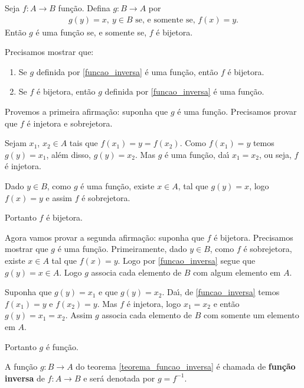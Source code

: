 \begin{teorema}\label{teorema_funcao_inversa}
	Seja $f: A \to B$ fun{\c c}{\~a}o. Defina $g : B \to A$ por
	\begin{align}\label{funcao_inversa}
		g(y) = x,\ y \in B \mbox{ se, e somente se, } f(x) = y.
	\end{align}
	Ent{\~a}o $g$ {\'e} uma fun{\c c}{\~a}o se, e somente se, $f$ {\'e} bijetora.
\end{teorema}
\begin{prova}
	Precisamos mostrar que:
	\begin{enumerate}[label={\roman*})]
		\item Se $g$ definida por \eqref{funcao_inversa} \'e uma fun\c{c}\~ao, ent\~ao $f$ \'e bijetora.
		\item Se $f$ \'e bijetora, ent\~ao $g$ definida por \eqref{funcao_inversa} \'e uma fun\c{c}\~ao.
	\end{enumerate}

	Provemos a primeira afirma\c{c}\~ao: suponha que $g$ \'e uma fun\c{c}\~ao. Precisamos provar que $f$ {\'e} injetora e sobrejetora.

	Sejam $x_1$, $x_2 \in A$ tais que $f(x_1) = y = f(x_2)$. Como $f(x_1) = y$ temos $g(y) = x_1$, al{\'e}m disso, $g(y) = x_2$. Mas $g$ {\'e} uma fun{\c c}{\~a}o, da{\'\i} $x_1 = x_2$, ou seja, $f$ {\'e} injetora.

	Dado $y \in B$, como $g$ {\'e} uma fun{\c c}{\~a}o, existe $x \in A$, tal que $g(y) = x$, logo $f(x) = y$ e assim $f$ {\'e} sobrejetora.

	Portanto $f$ {\'e} bijetora.

	Agora vamos provar a segunda afirma\c{c}\~ao: suponha que $f$ \'e bijetora. Precisamos mostrar que $g$ \'e uma fun\c{c}\~ao. Primeiramente, dado $y \in B$, como $f$ {\'e} sobrejetora, existe $x \in A$ tal que $f(x) = y$. Logo por \eqref{funcao_inversa} segue que $g(y) = x \in A$. Logo $g$ associa cada elemento de $B$ com algum elemento em $A$.

	Suponha que $g(y) = x_1$ e que $g(y) = x_2$. Da{\'\i}, de \eqref{funcao_inversa} temos $f(x_1) = y$ e $f(x_2) = y$. Mas $f$ {\'e} injetora, logo $x_1 = x_2$ e ent{\~a}o $g(y) = x_1 = x_2$. Assim $g$ associa cada elemento de $B$ com somente um elemento em $A$.

	Portanto $g$ {\'e} fun{\c c}{\~a}o.
\end{prova}


\begin{definicao}
	A fun\c{c}\~ao $g : B \to A$ do teorema \ref{teorema_funcao_inversa} \'e chamada de \textbf{fun\c{c}\~ao inversa} de $f : A \to B$ e ser\'a denotada por $g = f^{-1}$.
\end{definicao}


